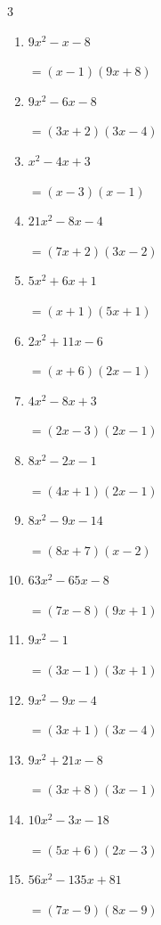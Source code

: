 \begin{multicols}{3}
\begin{enumerate}
        $=(9x-4)(x-6)$

  \item $9x^{2}-x-8$

        $=(x-1)(9x+8)$

  \item $9x^{2}-6x-8$

        $=(3x+2)(3x-4)$

  \item $x^{2}-4x+3$

        $=(x-3)(x-1)$

  \item $21x^{2}-8x-4$

        $=(7x+2)(3x-2)$

  \item $5x^{2}+6x+1$

        $=(x+1)(5x+1)$

\columnbreak %

  \item $2x^{2}+11x-6$

        $=(x+6)(2x-1)$

  \item $4x^{2}-8x+3$

        $=(2x-3)(2x-1)$

  \item $8x^{2}-2x-1$

        $=(4x+1)(2x-1)$

  \item $8x^{2}-9x-14$

        $=(8x+7)(x-2)$

  \item $63x^{2}-65x-8$

        $=(7x-8)(9x+1)$

  \item $9x^{2}-1$

        $=(3x-1)(3x+1)$

  \item $9x^{2}-9x-4$

        $=(3x+1)(3x-4)$

  \item $9x^{2}+21x-8$

        $=(3x+8)(3x-1)$

  \item $10x^{2}-3x-18$

        $=(5x+6)(2x-3)$

  \item $56x^{2}-135x+81$

        $=(7x-9)(8x-9)$


\end{enumerate}
\end{multicols}

